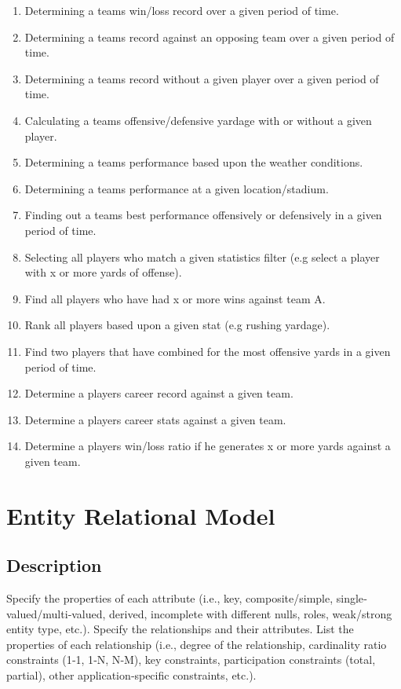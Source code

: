 \documentclass[12pt,letterpaper]{article}
\begin{document}
\begin{enumerate}
\item Determining a teams win/loss record over a given period of time.
\item Determining a teams record against an opposing team over a given period of time.
\item Determining a teams record without a given player over a given period of time.
\item Calculating a teams offensive/defensive yardage with or without a given player.
\item Determining a teams performance based upon the weather conditions.
\item Determining a teams performance at a given location/stadium.
\item Finding out a teams best performance offensively or defensively in a given period of time.
\item Selecting all players who match a given statistics filter (e.g select a player with x or more yards of offense).
\item Find all players who have had x or more wins against team A.
\item Rank all players based upon a given stat (e.g rushing yardage).
\item Find two players that have combined for the most offensive yards in a given period of time.
\item Determine a players career record against a given team.
\item Determine a players career stats against a given team.
\item Determine a players win/loss ratio if he generates x or more yards against a given team.
\end{enumerate}

\clearpage\null

\section{Entity Relational Model}
\subsection{Description}
Specify the properties of each attribute (i.e., key, composite/simple, single‐valued/multi‐valued, derived, incomplete with different nulls, roles, weak/strong entity type, etc.). Specify the relationships and their attributes. List the properties of each relationship (i.e., degree of the relationship, cardinality ratio constraints (1‐1, 1‐N, N‐M), key constraints, participation constraints (total, partial), other application‐specific constraints, etc.).
\end{document}

